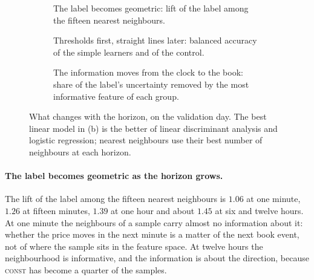 \begin{figure}[p]
\centering
\begin{subfigure}{\textwidth}\centering\caption{The label becomes geometric: lift of the label among the fifteen nearest neighbours.}\end{subfigure}

\medskip
\begin{subfigure}{\textwidth}\centering\caption{Thresholds first, straight lines later: balanced accuracy of the simple learners and of the control.}\end{subfigure}

\medskip
\begin{subfigure}{\textwidth}\centering\caption{The information moves from the clock to the book: share of the label's uncertainty removed by the most informative feature of each group.}\end{subfigure}
\caption{What changes with the horizon, on the validation day.  The best linear model in
(b) is the better of linear discriminant analysis and logistic regression; nearest
neighbours use their best number of neighbours at each horizon.}
\label{fig:structure:horizons}
\end{figure}

\paragraph{The label becomes geometric as the horizon grows.}  The lift of the label among
the fifteen nearest neighbours is $1.06$ at one minute, $1.26$ at fifteen minutes, $1.39$
at one hour and about $1.45$ at six and twelve hours.  At one minute the neighbours of a
sample carry almost no information about it: whether the price moves in the next minute
is a matter of the next book event, not of where the sample sits in the feature space.  At
twelve hours the neighbourhood is informative, and the information is about the
direction, because \textsc{const} has become a quarter of the samples.

